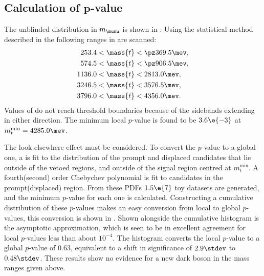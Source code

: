 \subsection[Calculation of $p$-value]
{Calculation of $\boldsymbol{p}$-value}

The unblinded distribution in $m_{\mumu}$ is shown in .
Using the statistical method described in  the following ranges in 
are scanned:
\begin{align*}
  253.4 &< \mass{t} < \pz369.5 \mev, \\
  574.5 &< \mass{t} < \pz906.5 \mev, \\
  1136.0 &< \mass{t} < 2813.0 \mev, \\
  3246.5 &< \mass{t} < 3576.5 \mev, \\
  3796.0 &< \mass{t} < 4356.0 \mev.
\end{align*}
Values of  do not reach threshold boundaries because of the sidebands extending in either
direction.
The minimum local $p$-value is found to be $3.6\e{-3}$ at $m_{t}^\mathrm{min} = 4285.0\mev$.

The look-elsewhere effect must be considered.
To convert the $p$-value to a global one, a \PDF is fit to the \mass{\mumu} distribution of the
prompt and displaced \btokstrdb candidates that lie outside of the vetoed regions, and outside of
the signal region centred at $m_t^\mathrm{min}$.
A fourth(second) order Chebychev polynomial is fit to candidates in the prompt(displaced) region.
From these \glspl{PDF} $1.5\e{7}$ toy datasets are generated, and the minimum $p$-value for each
one is calculated.
Constructing a cumulative distribution of these $p$-values makes an easy conversion from local to
global $p$-values, this conversion is shown in .
Shown alongside the cumulative histogram is the asymptotic approximation, which is seen to be in
excellent agreement for local $p$-values less than about $10^{-4}$.
The histogram converts the local $p$-value to a global $p$-value of $0.63$, equivalent to a shift
in significance of $2.9\stdev$ to $0.48\stdev$.
These results show no evidence for a new dark boson in the mass ranges given above.

